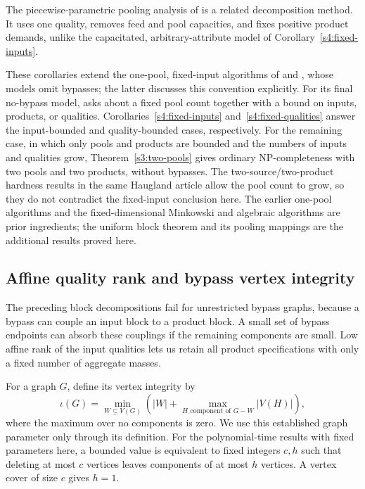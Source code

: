 The piecewise-parametric pooling analysis of
\citet[Assumption~2.2]{s3:baltean2018} is a related decomposition
method. It uses one quality, removes feed and pool capacities, and
fixes positive product demands, unlike the capacitated,
arbitrary-attribute model of Corollary~\ref{s4:fixed-inputs}.

These corollaries extend the one-pool, fixed-input algorithms of
\citet[Theorem~1]{s4:boland2017} and
\citet[Theorem~4.1]{s3:haugland-hendrix2016}, whose models omit
bypasses; the latter discusses this convention explicitly. For its
final no-bypass model, \citet[Section~6, p.~214]
{haugland2016-the-computational-complexity-of-the} asks about a fixed
pool count together with a bound on inputs, products, or qualities.
Corollaries~\ref{s4:fixed-inputs} and~\ref{s4:fixed-qualities} answer
the input-bounded and quality-bounded cases, respectively. For the
remaining case, in which only pools and products are bounded and the
numbers of inputs and qualities grow, Theorem~\ref{s3:two-pools} gives
ordinary NP-completeness with two pools and two products, without
bypasses. The two-source/two-product hardness results in the same
Haugland article allow the pool count to grow, so they do not
contradict the fixed-input conclusion here. The earlier one-pool
algorithms and the fixed-dimensional Minkowski and algebraic algorithms
are prior ingredients; the uniform block theorem and its pooling
mappings are the additional results proved here.

\subsection{Affine quality rank and bypass vertex integrity}
\label{s4:bypass-structure}

The preceding block decompositions fail for unrestricted bypass graphs,
because a bypass can couple an input block to a product block. A small
set of bypass endpoints can absorb these couplings if the remaining
components are small. Low affine rank of the input qualities lets us
retain all product specifications with only a fixed number of aggregate
masses.

For a graph $G$, define its vertex integrity by
\[
 \iota(G)=\min_{W\subseteq V(G)}
 \left(|W|+\max_{H\text{ component of }G-W}|V(H)|\right),
\]
where the maximum over no components is zero. We use this established
graph parameter only through its definition. For the polynomial-time
results with fixed parameters here, a bounded value is equivalent to fixed
integers $c,h$ such that deleting at most $c$ vertices leaves components
of at most $h$ vertices. A vertex cover of size $c$ gives $h=1$.

